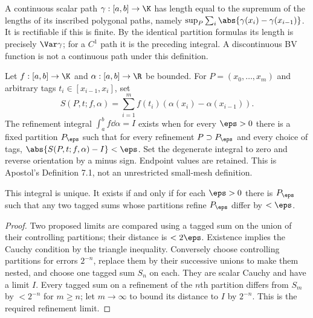 \begin{definition}
A continuous scalar path $\gamma:[a,b]\to\K$ has length equal to the supremum of the lengths of its inscribed polygonal paths, namely $\sup_P\sum_i\abs{\gamma(x_i)-\gamma(x_{i-1})}$. It is rectifiable if this is finite. By the identical partition formulas its length is precisely $\Var\gamma$; for a $C^1$ path it is the preceding integral. A discontinuous BV function is not a continuous path under this definition.
\end{definition}

\begin{definition}
Let $f:[a,b]\to\K$ and $\alpha:[a,b]\to\R$ be bounded. For $P=(x_0,\ldots,x_m)$ and arbitrary tags $t_i\in[x_{i-1},x_i]$, set
\[S(P,t;f,\alpha)=\sum_{i=1}^mf(t_i)(\alpha(x_i)-\alpha(x_{i-1})).\]
The refinement integral $\int_a^b f\dd\alpha=I$ exists when for every $\eps>0$ there is a fixed partition $P_\eps$ such that for every refinement $P\supset P_\eps$ and every choice of tags, $\abs{S(P,t;f,\alpha)-I}<\eps$. Set the degenerate integral to zero and reverse orientation by a minus sign. Endpoint values are retained. This is Apostol's Definition 7.1, not an unrestricted small-mesh definition.
\end{definition}
\begin{lemma}
This integral is unique. It exists if and only if for each $\eps>0$ there is $P_\eps$ such that any two tagged sums whose partitions refine $P_\eps$ differ by $<\eps$.
\end{lemma}
\begin{proof}
Two proposed limits are compared using a tagged sum on the union of their controlling partitions; their distance is $<2\eps$. Existence implies the Cauchy condition by the triangle inequality. Conversely choose controlling partitions for errors $2^{-n}$, replace them by their successive unions to make them nested, and choose one tagged sum $S_n$ on each. They are scalar Cauchy and have a limit $I$. Every tagged sum on a refinement of the $n$th partition differs from $S_m$ by $<2^{-n}$ for $m\geq n$; let $m\to\infty$ to bound its distance to $I$ by $2^{-n}$. This is the required refinement limit.
\end{proof}


